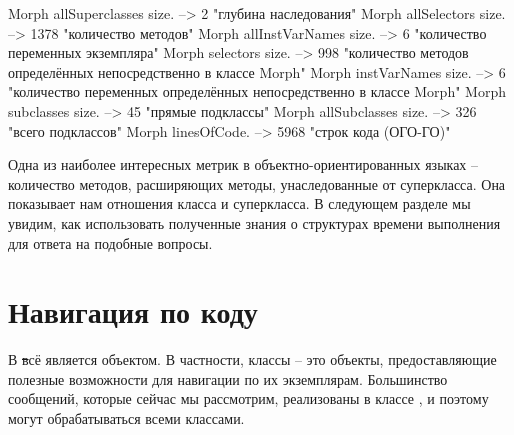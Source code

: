 \documentclass[a4paper,10pt,twoside]{book}
\begin{document}
\begin{code}{}
Morph allSuperclasses size.  -->       2 "глубина наследования"
Morph allSelectors size.        --> 1378 "количество методов"
Morph allInstVarNames size. -->      6 "количество переменных экземпляра"
Morph selectors size.             -->  998 "количество методов определённых непосредственно в классе Morph"
Morph instVarNames size.     -->      6 "количество переменных определённых непосредственно в классе Morph"
Morph subclasses size.          -->    45 "прямые подклассы"
Morph allSubclasses size.      -->  326 "всего подклассов"
Morph linesOfCode.               --> 5968 "строк кода (ОГО-ГО)"
\end{code}

Одна из наиболее интересных метрик в объектно-ориентированных языках -- количество методов, расширяющих методы, унаследованные от суперкласса. 
Она показывает нам отношения класса и суперкласса.
В следующем разделе мы увидим, как использовать полученные знания о структурах времени выполнения для ответа на подобные вопросы.

\section{Навигация по коду}

В \st всё является объектом. В частности, классы -- это объекты, предоставляющие полезные возможности для навигации по их экземплярам.
Большинство сообщений, которые сейчас мы рассмотрим, реализованы в классе , и поэтому могут обрабатываться всеми классами.
\end{document}
